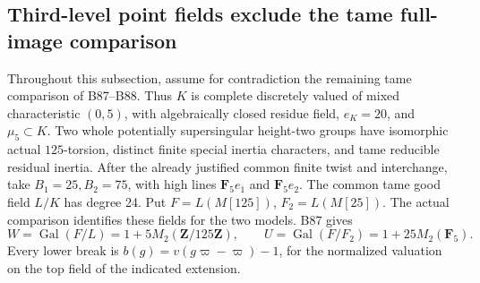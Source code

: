 \subsection{Third-level point fields exclude the tame full-image comparison}

Throughout this subsection, assume for contradiction the remaining tame
comparison of B87--B88. Thus \(K\) is complete discretely valued of mixed
characteristic \((0,5)\), with algebraically closed residue field,
\(e_K=20\), and \(\mu_5\subset K\). Two whole potentially supersingular
height-two groups have isomorphic actual \(125\)-torsion, distinct finite
special inertia characters, and tame reducible residual inertia.
After the already justified common finite twist and interchange, take
\(B_1=25,B_2=75\), with high lines \(\mathbf F_5e_1\) and
\(\mathbf F_5e_2\). The common tame good field \(L/K\) has degree 24.
Put \(F=L(M[125])\), \(F_2=L(M[25])\). The actual comparison identifies
these fields for the two models. B87 gives
\[
 W=\operatorname{Gal}(F/L)=1+5M_2(\mathbf Z/125\mathbf Z),
 \qquad U=\operatorname{Gal}(F/F_2)=1+25M_2(\mathbf F_5).
 \tag{B-RD90.1}
\]
Every lower break is \(b(g)=v(g\varpi-\varpi)-1\), for the normalized
valuation on the top field of the indicated extension.

